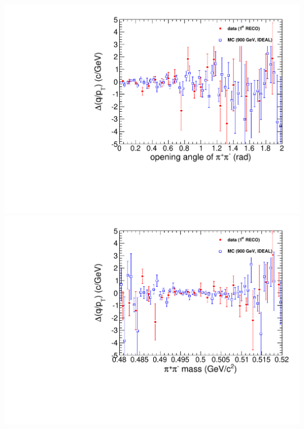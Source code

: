 \documentclass[compress]{beamer}
\begin{document}
\begin{frame}
\includegraphics[width=0.5\linewidth]{kaonTracking2_deltaqoverpt_vsopening.pdf}
\includegraphics[width=0.5\linewidth]{kaonTracking2_deltaqoverpt_vsmass.pdf}
\end{frame}


\begin{frame}
\label{numpages}
\end{frame}
\end{document}
